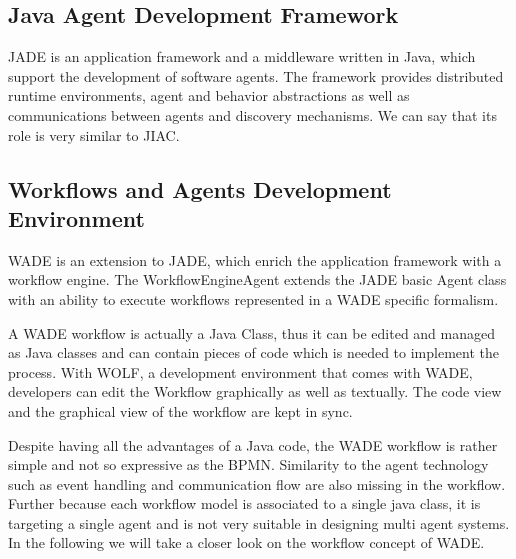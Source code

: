 \subsection{Java Agent Development Framework}
JADE \cite{FBGCAPGR08, FBAPGR99} is an application framework and a middleware written in Java, which support the development of software agents. The framework  provides distributed runtime environments, agent and behavior abstractions as well as communications between agents and discovery mechanisms. We can say that its role is very similar to JIAC.

\subsection{Workflows and Agents Development Environment}
WADE \cite{WEB} is an extension to JADE, which enrich the application framework with a workflow engine. The WorkflowEngineAgent extends the JADE basic Agent class with an ability to execute workflows represented in a WADE specific formalism.

A WADE workflow is actually a Java Class, thus it can be edited and managed as Java classes and can contain pieces of code which is needed to implement the process. With WOLF, a development environment that comes with WADE, developers can edit the Workflow graphically as well as textually. The code view and the graphical view of the workflow are kept in sync.

Despite having all the advantages of a Java code, the WADE workflow is rather simple and not so expressive as the BPMN. Similarity to the agent technology such as event handling and communication flow are also missing in the workflow. Further because each workflow model is associated to a single java class, it is targeting a single agent and is not very suitable in designing multi agent systems. In the following we will take a closer look on the workflow concept of WADE. 


